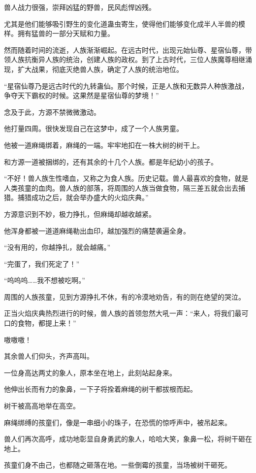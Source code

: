 \begin{this_body}
兽人战力很强，崇拜凶猛的野兽，民风彪悍凶残。

尤其是他们能够吸引野生的变化道蛊虫寄生，使得他们能够变化成半人半兽的模样。拥有猛兽的一部分天赋和力量。

然而随着时间的流逝，人族渐渐崛起。在远古时代，出现元始仙尊、星宿仙尊，带领人族抗衡异人族的统治，创建人族的政权。到了上古时代，三位人族魔尊相继涌现，扩大战果，彻底灭绝兽人族，确定了人族的统治地位。

“星宿仙尊乃是远古时代的九转蛊仙。那个时候，正是人族和无数异人种族激战，争夺天下霸权的时候。这果然是星宿仙尊的梦境！”

念及于此，方源不禁微微激动。

他打量四周。很快发现自己在这梦中，成了一个人族男童。

他被一道麻绳绑着，麻绳的一端。牢牢地扣在一株大树的树干上。

和方源一道被捆绑的，还有其余的十几个人族。都是年纪幼小的孩子。

“不好！兽人族生性嗜血，又称之为食人族。历史记载。兽人最喜欢的食物，就是人类孩童的血肉。兽人族的部落，将周围的人族当做食物，隔三差五就会出去捕猎。捕猎成功之后，就会举办盛大的火焰庆典。”

方源意识到不妙，极力挣扎，但麻绳却越收越紧。

他浑身都被一道道麻绳勒出血印，越加强烈的痛楚袭遍全身。

“没有用的，你越挣扎，就会越痛。”

“完蛋了，我们死定了！”

“呜呜呜……我不想被吃啊。”

周围的人族孩童，见到方源挣扎不休，有的冷漠地劝告，有的则在绝望的哭泣。

正当火焰庆典热烈进行的时候，兽人族的首领忽然大吼一声：“来人，将我们最可口的食物，都提上来！”

嗷嗷嗷！

其余兽人们仰头，齐声高叫。

一位身高达两丈的象人，原本坐在地上，此刻站起身来。

他伸出长而有力的象鼻，一下子将拴着麻绳的树干都拔根而起。

树干被高高地举在高空。

麻绳绑缚的孩童们，像是一串细小的珠子，在恐慌的惊呼声中，被吊起来。

兽人们再次高呼，成功地彰显自身勇武的象人，哈哈大笑，象鼻一松，将树干砸在地上。

孩童们身不由己，也都随之砸落在地。一些倒霉的孩童，当场被树干砸死。


\end{this_body}
